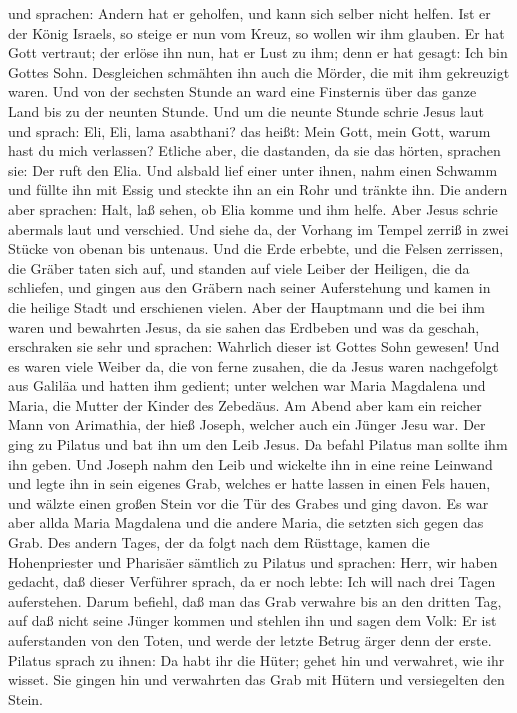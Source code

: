 und sprachen:  Andern hat er geholfen, und kann sich selber
nicht helfen. Ist er der König Israels, so steige er nun vom Kreuz, so
wollen wir ihm glauben.  Er hat Gott vertraut; der erlöse
ihn nun, hat er Lust zu ihm; denn er hat gesagt: Ich bin Gottes Sohn.
 Desgleichen schmähten ihn auch die Mörder, die mit ihm
gekreuzigt waren.  Und von der sechsten Stunde an ward eine
Finsternis über das ganze Land bis zu der neunten Stunde. 
Und um die neunte Stunde schrie Jesus laut und sprach: Eli, Eli, lama
asabthani? das heißt: Mein Gott, mein Gott, warum hast du mich
verlassen?  Etliche aber, die dastanden, da sie das hörten,
sprachen sie: Der ruft den Elia.  Und alsbald lief einer
unter ihnen, nahm einen Schwamm und füllte ihn mit Essig und steckte ihn
an ein Rohr und tränkte ihn.  Die andern aber sprachen:
Halt, laß sehen, ob Elia komme und ihm helfe.  Aber Jesus
schrie abermals laut und verschied.  Und siehe da, der
Vorhang im Tempel zerriß in zwei Stücke von obenan bis untenaus.
 Und die Erde erbebte, und die Felsen zerrissen, die Gräber
taten sich auf, und standen auf viele Leiber der Heiligen, die da
schliefen,  und gingen aus den Gräbern nach seiner
Auferstehung und kamen in die heilige Stadt und erschienen vielen.
 Aber der Hauptmann und die bei ihm waren und bewahrten
Jesus, da sie sahen das Erdbeben und was da geschah, erschraken sie sehr
und sprachen: Wahrlich dieser ist Gottes Sohn gewesen!  Und
es waren viele Weiber da, die von ferne zusahen, die da Jesus waren
nachgefolgt aus Galiläa und hatten ihm gedient;  unter
welchen war Maria Magdalena und Maria, die Mutter der Kinder des
Zebedäus.  Am Abend aber kam ein reicher Mann von
Arimathia, der hieß Joseph, welcher auch ein Jünger Jesu war.
 Der ging zu Pilatus und bat ihn um den Leib Jesus. Da
befahl Pilatus man sollte ihm ihn geben.  Und Joseph nahm
den Leib und wickelte ihn in eine reine Leinwand  und legte
ihn in sein eigenes Grab, welches er hatte lassen in einen Fels hauen,
und wälzte einen großen Stein vor die Tür des Grabes und ging davon.
 Es war aber allda Maria Magdalena und die andere Maria,
die setzten sich gegen das Grab.  Des andern Tages, der da
folgt nach dem Rüsttage, kamen die Hohenpriester und Pharisäer sämtlich
zu Pilatus  und sprachen: Herr, wir haben gedacht, daß
dieser Verführer sprach, da er noch lebte: Ich will nach drei Tagen
auferstehen.  Darum befiehl, daß man das Grab verwahre bis
an den dritten Tag, auf daß nicht seine Jünger kommen und stehlen ihn
und sagen dem Volk: Er ist auferstanden von den Toten, und werde der
letzte Betrug ärger denn der erste.  Pilatus sprach zu
ihnen: Da habt ihr die Hüter; gehet hin und verwahret, wie ihr wisset.
 Sie gingen hin und verwahrten das Grab mit Hütern und
versiegelten den Stein.

